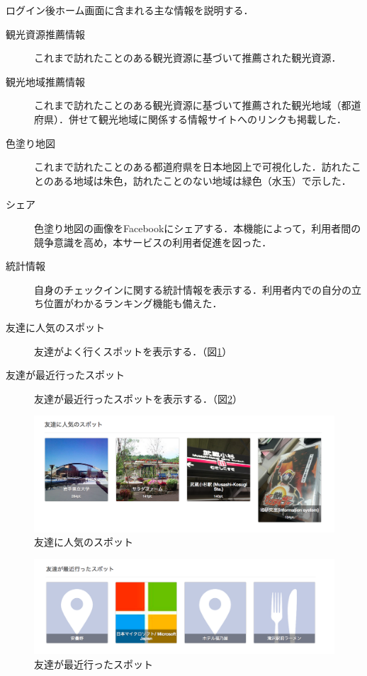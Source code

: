 \documentclass{jsarticle}
\begin{document}
ログイン後ホーム画面に含まれる主な情報を説明する．

\begin{description}
\item[観光資源推薦情報] これまで訪れたことのある観光資源に基づいて推薦された観光資源．
\item[観光地域推薦情報] これまで訪れたことのある観光資源に基づいて推薦された観光地域（都道府県）．併せて観光地域に関係する情報サイトへのリンクも掲載した．
\item[色塗り地図] これまで訪れたことのある都道府県を日本地図上で可視化した．訪れたことのある地域は朱色，訪れたことのない地域は緑色（水玉）で示した．
\item[シェア] 色塗り地図の画像をFacebookにシェアする．本機能によって，利用者間の競争意識を高め，本サービスの利用者促進を図った．
\item[統計情報] 自身のチェックインに関する統計情報を表示する．利用者内での自分の立ち位置がわかるランキング機能も備えた．
\item[友達に人気のスポット] 友達がよく行くスポットを表示する．（図\ref{cheekitrip_friends_popular_spot}）
\item[友達が最近行ったスポット] 友達が最近行ったスポットを表示する．（図\ref{cheekitrip_friends_recently_spot}）
\end{description}

\begin{figure}[!ht]
\begin{center}
\includegraphics[width=12.0cm]{./image/cheekitrip_friends_popular_spot.png}
\caption{友達に人気のスポット}
\label{cheekitrip_friends_popular_spot}
\end{center}
\end{figure}

\begin{figure}[!ht]
\begin{center}
\includegraphics[width=12.0cm]{./image/cheekitrip_friends_recently_spot.png}
\caption{友達が最近行ったスポット}
\label{cheekitrip_friends_recently_spot}
\end{center}
\end{figure}
\end{document}
